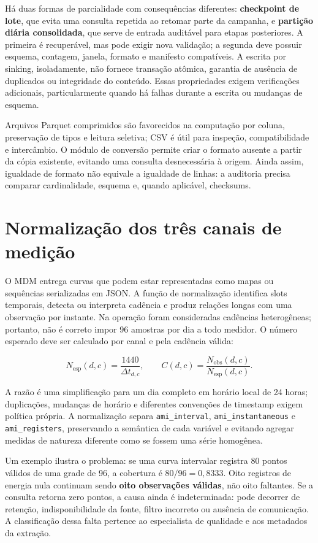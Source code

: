 Há duas formas de parcialidade com consequências diferentes: \textbf{checkpoint de lote}, que evita uma consulta repetida ao retomar parte da campanha, e \textbf{partição diária consolidada}, que serve de entrada auditável para etapas posteriores. A primeira é recuperável, mas pode exigir nova validação; a segunda deve possuir esquema, contagem, janela, formato e manifesto compatíveis. A escrita por sinking, isoladamente, não fornece transação atômica, garantia de ausência de duplicados ou integridade do conteúdo. Essas propriedades exigem verificações adicionais, particularmente quando há falhas durante a escrita ou mudanças de esquema.

Arquivos Parquet comprimidos são favorecidos na computação por coluna, preservação de tipos e leitura seletiva; CSV é útil para inspeção, compatibilidade e intercâmbio. O módulo de conversão permite criar o formato ausente a partir da cópia existente, evitando uma consulta desnecessária à origem. Ainda assim, igualdade de formato não equivale a igualdade de linhas: a auditoria precisa comparar cardinalidade, esquema e, quando aplicável, checksums.

\section{Normalização dos três canais de medição}\label{normalizauxe7uxe3o-dos-truxeas-canais-de-mediuxe7uxe3o}

O MDM entrega curvas que podem estar representadas como mapas ou sequências serializadas em JSON. A função de normalização identifica slots temporais, detecta ou interpreta cadência e produz relações longas com uma observação por instante. Na operação foram consideradas cadências heterogêneas; portanto, não é correto impor 96 amostras por dia a todo medidor. O número esperado deve ser calculado por canal e pela cadência válida:

\[N_{\mathrm{esp}}(d,c)=\frac{1440}{\Delta t_{d,c}},\qquad C(d,c)=\frac{N_{\mathrm{obs}}(d,c)}{N_{\mathrm{esp}}(d,c)}.\]

A razão é uma simplificação para um dia completo em horário local de 24 horas; duplicações, mudanças de horário e diferentes convenções de timestamp exigem política própria. A normalização separa \texttt{ami\_interval}, \texttt{ami\_instantaneous} e \texttt{ami\_registers}, preservando a semântica de cada variável e evitando agregar medidas de natureza diferente como se fossem uma série homogênea.

Um exemplo ilustra o problema: se uma curva intervalar registra 80 pontos válidos de uma grade de 96, a cobertura é \(80/96=0{,}8333\). Oito registros de energia nula continuam sendo \textbf{oito observações válidas}, não oito faltantes. Se a consulta retorna zero pontos, a causa ainda é indeterminada: pode decorrer de retenção, indisponibilidade da fonte, filtro incorreto ou ausência de comunicação. A classificação dessa falta pertence ao especialista de qualidade e aos metadados da extração.


